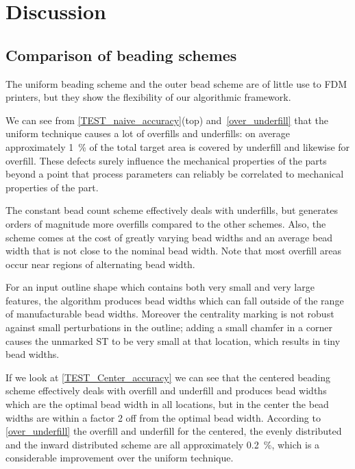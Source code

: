 \section{Discussion}


\subsection{Comparison of beading schemes}
The uniform beading scheme and the outer bead scheme are of little use to FDM printers, but they show the flexibility of our algorithmic framework.

We can see from \cref{TEST_naive_accuracy}(top) and~\ref{over_underfill} that the uniform technique causes a lot of overfills and underfills: on average approximately \SI{1}{\percent} of the total target area is covered by underfill and likewise for overfill.
These defects surely influence the mechanical properties of the parts beyond a point that process parameters can reliably be correlated to mechanical properties of the part.


The constant bead count scheme effectively deals with underfills, but generates orders of magnitude more overfills compared to the other schemes. 
Also, the scheme comes at the cost of greatly varying bead widths and an average bead width that is not close to the nominal bead width.
Note that most overfill areas occur near regions of alternating bead width. 

For an input outline shape which contains both very small and very large features, the algorithm produces bead widths which can fall outside of the range of manufacturable bead widths.
Moreover the centrality marking is not robust against small perturbations in the outline; adding a small chamfer in a corner causes the unmarked ST to be very small at that location, which results in tiny bead widths.

If we look at \cref{TEST_Center_accuracy} we can see that
the centered beading scheme effectively deals with overfill and underfill and produces bead widths which are the optimal bead width in all locations, but in the center the bead widths are within a factor 2 off from the optimal bead width.
According to \cref{over_underfill} the overfill and underfill for the centered, the evenly distributed and the inward distributed scheme are all approximately \SI{0.2}{\percent}, which is a considerable improvement over the uniform technique.

